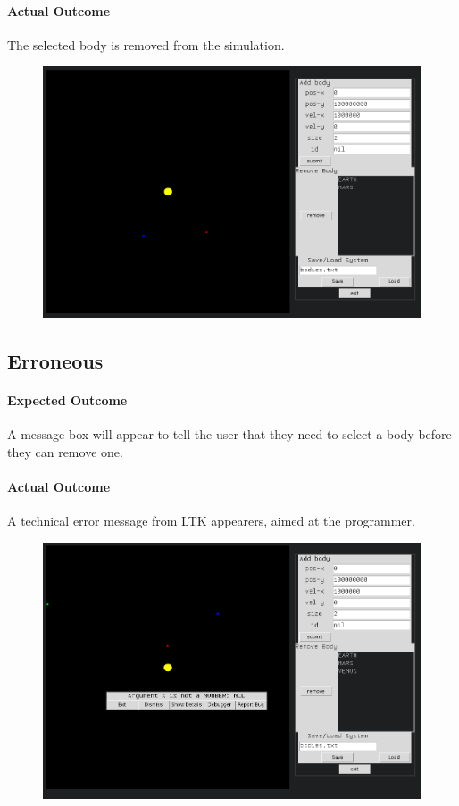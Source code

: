 \paragraph{Actual Outcome}
The selected body is removed from the simulation.
\begin{figure}[H]
	\includegraphics[width=\textwidth]{./img/rm.png}
\end{figure}

\subsection{Erroneous}
\paragraph{Expected Outcome}
A message box will appear to tell the user that they need to select a body
before they can remove one.
\paragraph{Actual Outcome}
A technical error message from LTK appearers, aimed at the programmer.
\begin{figure}[H]
	\includegraphics[width=\textwidth]{./img/rm2.png}
\end{figure}
